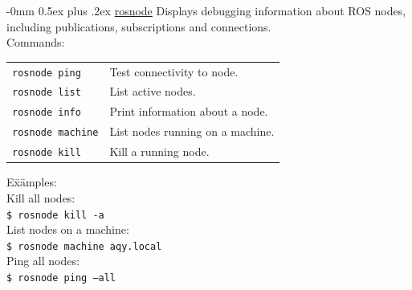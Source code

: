 \documentclass[10pt,landscape]{article}
\makeatletter
\renewcommand{\subsection}{\@startsection{subsection}{2}{0mm}%
                                {-0mm}%
                                {0.5ex plus .2ex}%
                                {\normalfont\normalsize\bfseries}}
\newenvironment{nstabbing}
  {\setlength{\topsep}{1pt}%
   \setlength{\partopsep}{1pt}%
   \tabbing}
  {\endtabbing}
\makeatother
\begin{document}
\begin{multicols}{3}
\subsection{\href{http://wiki.ros.org/rosnode}{rosnode}}
Displays debugging information about ROS nodes, including publications, subscriptions and connections.\\
Commands: \\
\begin{tabular}{p{\the\MyLen}%
                @{}p{\linewidth-\the\MyLen}@{}}
\texttt{rosnode ping}    & Test connectivity to node. \\
\texttt{rosnode list}    & List active nodes. \\
\texttt{rosnode info}    & Print information about a node. \\
\texttt{rosnode machine} & List nodes running on a machine. \\
\texttt{rosnode kill}    & Kill a running node.
\end{tabular}
\begin{nstabbing}
E\=x\=amples:\\
\> Kill all nodes:\\
\> \> \texttt{\$ rosnode kill -a}\\
\> List nodes on a machine:\\
\> \> \texttt{\$ rosnode machine aqy.local}\\
\> Ping all nodes:\\
\> \> \texttt{\$ rosnode ping --all}
\end{nstabbing}


\vspace{10.5 mm}

\end{multicols}
\end{document}

